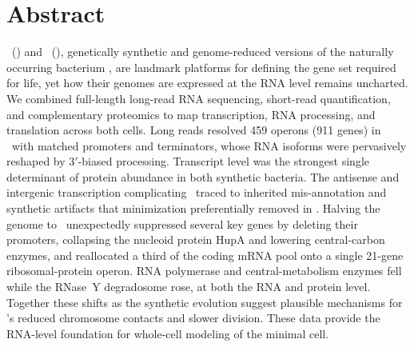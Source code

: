 \section{Abstract}

\jsyn~(\syn) and \jsyna~(\syna), genetically synthetic and genome-reduced versions of the naturally occurring bacterium \Mmy, are landmark platforms for defining the gene set required for life, yet how their genomes are expressed at the RNA level remains uncharted.
We combined full-length long-read RNA sequencing, short-read quantification, and complementary proteomics to map transcription, RNA processing, and translation across both cells.
Long reads resolved 459 operons (911 genes) in \syn~with matched promoters and terminators, whose RNA isoforms were pervasively reshaped by 3$'$-biased processing.
Transcript level was the strongest single determinant of protein abundance in both synthetic bacteria.
The antisense and intergenic transcription complicating \syn~traced to inherited mis-annotation and synthetic artifacts that minimization preferentially removed in \syna.
Halving the genome to \syna~unexpectedly suppressed several key genes by deleting their promoters, collapsing the nucleoid protein HupA and lowering central-carbon enzymes, and reallocated a third of the coding mRNA pool onto a single 21-gene ribosomal-protein operon.
RNA polymerase and central-metabolism enzymes fell while the RNase~Y degradosome rose, at both the RNA and protein level.
Together these shifts as the synthetic evolution suggest plausible mechanisms for \syna's reduced chromosome contacts and slower division.
These data provide the RNA-level foundation for whole-cell modeling of the minimal cell.

\newpage
